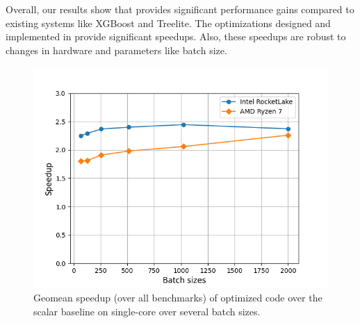 Overall, our results show that \Treebeard{} provides significant performance gains compared to existing systems like XGBoost and Treelite.
The optimizations designed and implemented in \Treebeard{} provide significant speedups. Also, these speedups are robust to changes
in hardware and parameters like batch size.


\begin{figure}[htbp]
  \centering
  \includegraphics[width=0.8\linewidth]{figures/result/scalar_overall_mean_speedups_intel_amd.png}
  \caption{Geomean speedup (over all benchmarks) of optimized \Treebeard{} code over the scalar baseline on single-core
           over several batch sizes.}
  \label{Fig:OverallScalarOverBatchSizes}
\end{figure}

